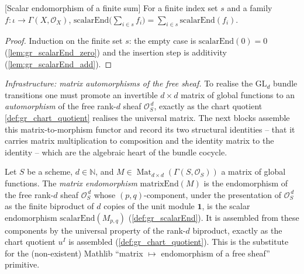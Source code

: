 \begin{lemma}

[Scalar endomorphism of a finite sum]
  \label{lem:gr_scalarEnd_sum}
  For a finite index set \(s\) and a family \(f : \iota \to \Gamma(X, \mathcal{O}_X)\),
  \(\mathrm{scalarEnd}\bigl(\sum_{i \in s} f_i\bigr) = \sum_{i \in s} \mathrm{scalarEnd}(f_i)\).
\end{lemma}
\begin{proof}
  Induction on the finite set \(s\): the empty case is \(\mathrm{scalarEnd}(0) = 0\)
  (\cref{lem:gr_scalarEnd_zero}) and the insertion step is additivity
  (\cref{lem:gr_scalarEnd_add}).
\end{proof}

\emph{Infrastructure: matrix automorphisms of the free sheaf.} To realise the
\(\mathrm{GL}_d\) bundle transitions one must promote an invertible \(d \times d\)
matrix of global functions to an \emph{automorphism} of the free rank-\(d\) sheaf
\(\mathcal{O}_S^{\,d}\), exactly as the chart quotient \cref{def:gr_chart_quotient}
realises the universal matrix. The next blocks assemble this matrix-to-morphism
functor and record its two structural identities -- that it carries matrix
multiplication to composition and the identity matrix to the identity -- which are
the algebraic heart of the bundle cocycle.

\begin{definition}
  \label{def:gr_matrixEnd}
  Let \(S\) be a scheme, \(d \in \mathbb{N}\), and
  \(M \in \operatorname{Mat}_{d \times d}(\Gamma(S, \mathcal{O}_S))\) a matrix of
  global functions. The \emph{matrix endomorphism} \(\mathrm{matrixEnd}(M)\) is the
  endomorphism of the free rank-\(d\) sheaf \(\mathcal{O}_S^{\,d}\) whose
  \((p,q)\)-component, under the presentation of \(\mathcal{O}_S^{\,d}\) as the
  finite biproduct of \(d\) copies of the unit module \(\mathbf{1}\), is the scalar
  endomorphism \(\mathrm{scalarEnd}(M_{p,q})\) (\cref{def:gr_scalarEnd}). It is
  assembled from these components by the universal property of the rank-\(d\)
  biproduct, exactly as the chart quotient \(u^I\) is assembled
  (\cref{def:gr_chart_quotient}). This is the substitute for the (non-existent)
  Mathlib ``matrix \(\mapsto\) endomorphism of a free sheaf'' primitive.
\end{definition}

